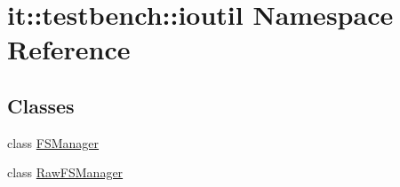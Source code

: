 \hypertarget{namespaceit_1_1testbench_1_1ioutil}{\section{it\-:\-:testbench\-:\-:ioutil Namespace Reference}
\label{db/dcd/namespaceit_1_1testbench_1_1ioutil}
}
\subsection*{Classes}
\begin{DoxyCompactItemize}
\item 
class \hyperlink{classit_1_1testbench_1_1ioutil_1_1FSManager}{F\-S\-Manager}
\item 
class \hyperlink{classit_1_1testbench_1_1ioutil_1_1RawFSManager}{Raw\-F\-S\-Manager}
\end{DoxyCompactItemize}
